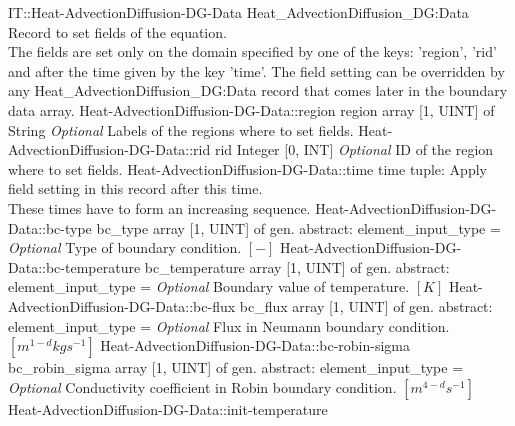 \begin{RecordType}
	{IT::Heat-AdvectionDiffusion-DG-Data}
	{Heat{\_}AdvectionDiffusion{\_}DG:Data}
	{}%
	{}%
	{{{Record to set fields of the equation.}\\{
The fields are set only on the domain specified by one of the keys: 'region', 'rid'}\\{
and after the time given by the key 'time'. The field setting can be overridden by}\\{
 any Heat{\_}AdvectionDiffusion{\_}DG:Data record that comes later in the boundary data array.}%
}}
		\RecKey
			{Heat-AdvectionDiffusion-DG-Data::region}
			{region}
			{{array [1, UINT] of }{String}}{}
			{ \it{Optional}}
			{{{Labels of the regions where to set fields. }%
}}
		\RecKey
			{Heat-AdvectionDiffusion-DG-Data::rid}
			{rid}
			{{Integer [0, INT]}}{}
			{ \it{Optional}}
			{{{ID of the region where to set fields.}%
}}
		\RecKey
			{Heat-AdvectionDiffusion-DG-Data::time}
			{time}
			{{tuple: }}{}
			{ }
			{{{Apply field setting in this record after this time.}\\{
These times have to form an increasing sequence.}%
}}
		\RecKey
			{Heat-AdvectionDiffusion-DG-Data::bc-type}
			{bc{\_}type}
			{{array [1, UINT] of }{gen. abstract: }}{{element{\_}input{\_}type}{ = }}
			{ \it{Optional}}
			{{{Type of boundary condition. }{$[-]$}%
}}
		\RecKey
			{Heat-AdvectionDiffusion-DG-Data::bc-temperature}
			{bc{\_}temperature}
			{{array [1, UINT] of }{gen. abstract: }}{{element{\_}input{\_}type}{ = }}
			{ \it{Optional}}
			{{{Boundary value of temperature. }{$[K]$}%
}}
		\RecKey
			{Heat-AdvectionDiffusion-DG-Data::bc-flux}
			{bc{\_}flux}
			{{array [1, UINT] of }{gen. abstract: }}{{element{\_}input{\_}type}{ = }}
			{ \it{Optional}}
			{{{Flux in Neumann boundary condition. }{$[m^{1-d}kgs^{-1}]$}%
}}
		\RecKey
			{Heat-AdvectionDiffusion-DG-Data::bc-robin-sigma}
			{bc{\_}robin{\_}sigma}
			{{array [1, UINT] of }{gen. abstract: }}{{element{\_}input{\_}type}{ = }}
			{ \it{Optional}}
			{{{Conductivity coefficient in Robin boundary condition. }{$[m^{4-d}s^{-1}]$}%
}}
		\RecKey
			{Heat-AdvectionDiffusion-DG-Data::init-temperature}

\end{RecordType}
